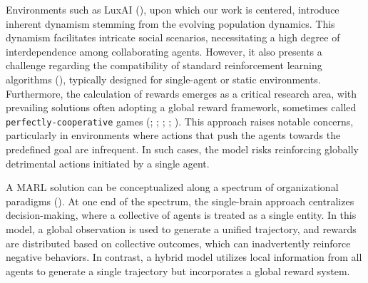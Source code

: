 \bigskip

\noindent Environments such as LuxAI (\textcolor{deepblue}{\cite{lux-ai-season-2}}), upon which our work is centered, introduce inherent dynamism stemming from the evolving population dynamics. This dynamism facilitates intricate social scenarios, necessitating a high degree of interdependence among collaborating agents. However, it also presents a challenge regarding the compatibility of standard reinforcement learning algorithms (\textcolor{deepblue}{\cite{wong2022deep}}), typically designed for single-agent or static environments. Furthermore, the calculation of rewards emerges as a critical research area, with prevailing solutions often adopting a global reward framework, sometimes called \textcolor{deepblue}{\texttt{perfectly-cooperative}} games (\textcolor{deepblue}{\cite{chen2023emergent}; \cite{agapiou2023melting}; \cite{ye2023global}; \cite{leroy2020qvmix}; \cite{suarez2019neural}}). This approach raises notable concerns, particularly in environments where actions that push the agents towards the predefined goal are infrequent. In such cases, the model risks reinforcing globally detrimental actions initiated by a single agent.

\bigskip

\noindent A MARL solution can be conceptualized along a spectrum of organizational paradigms (\textcolor{deepblue}{\cite{piccoli2023control}}). At one end of the spectrum, the single-brain approach centralizes decision-making, where a collective of agents is treated as a single entity. In this model, a global observation is used to generate a unified trajectory, and rewards are distributed based on collective outcomes, which can inadvertently reinforce negative behaviors. In contrast, a hybrid model utilizes local information from all agents to generate a single trajectory but incorporates a global reward system. 

\bigskip

